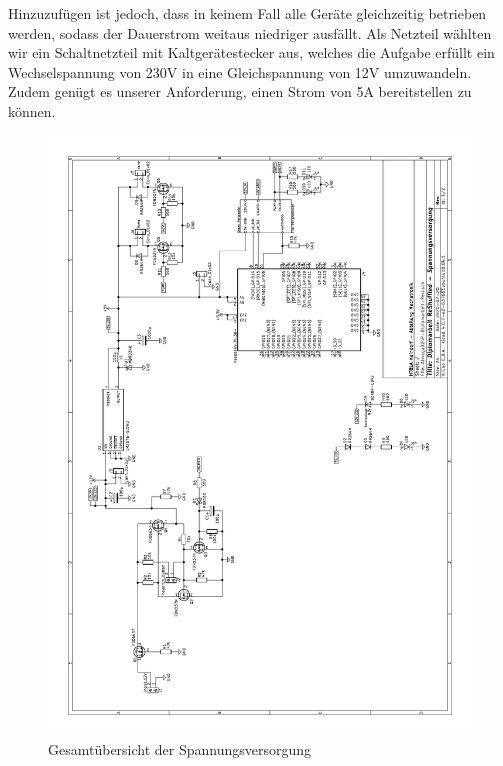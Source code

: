 Hinzuzufügen ist jedoch, dass in keinem Fall alle Geräte gleichzeitig betrieben werden, sodass der Dauerstrom weitaus niedriger ausfällt.
Als Netzteil wählten wir ein Schaltnetzteil mit Kaltgerätestecker aus, welches die Aufgabe erfüllt ein Wechselspannung von 230V in eine Gleichspannung von 12V umzuwandeln.
Zudem genügt es unserer Anforderung, einen Strom von 5A bereitstellen zu können.

\begin{figure}
    \includegraphics[scale=0.85,page=1]{fig/elektro/Schaltplan.pdf}
    \caption{Gesamtübersicht der Spannungsversorgung}
\end{figure}

